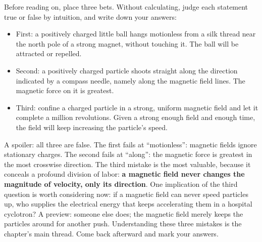 
\begin{mainline}
Before reading on, place three bets. Without calculating, judge each statement true or false by intuition, and write down your answers:

\begin{itemize}
  \item First: a positively charged little ball hangs motionless from a silk thread near the north pole of a strong magnet, without touching it. The ball will be attracted or repelled.
  \item Second: a positively charged particle shoots straight along the direction indicated by a compass needle, namely along the magnetic field lines. The magnetic force on it is greatest.
  \item Third: confine a charged particle in a strong, uniform magnetic field and let it complete a million revolutions. Given a strong enough field and enough time, the field will keep increasing the particle's speed.
\end{itemize}

A spoiler: all three are false. The first fails at ``motionless'': magnetic fields ignore stationary charges. The second fails at ``along'': the magnetic force is greatest in the most crosswise direction. The third mistake is the most valuable, because it conceals a profound division of labor: \textbf{a magnetic field never changes the magnitude of velocity, only its direction}. One implication of the third question is worth considering now: if a magnetic field can never speed particles up, who supplies the electrical energy that keeps accelerating them in a hospital cyclotron? A preview: someone else does; the magnetic field merely keeps the particles around for another push. Understanding these three mistakes is the chapter's main thread. Come back afterward and mark your answers.
\end{mainline}


